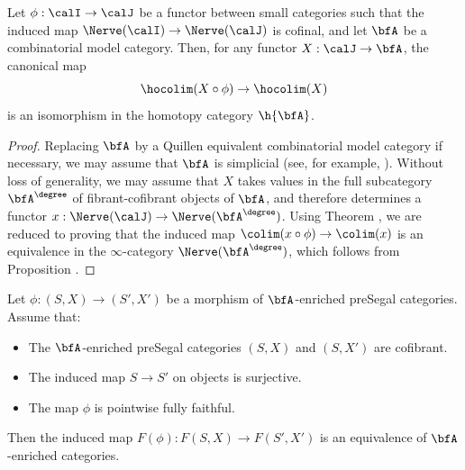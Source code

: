 \begin{lemma}\label{cuppl}
Let $\phi: \calI \rightarrow \calJ$ be a functor between small categories such that the induced map
$\Nerve( \calI ) \rightarrow \Nerve(\calJ)$ is cofinal, and let $\bfA$ be a combinatorial model category.
Then, for any functor $X: \calJ \rightarrow \bfA$, the canonical map
$$ \hocolim( X \circ \phi) \rightarrow \hocolim(X)$$
is an isomorphism in the homotopy category $\h{\bfA}$.
\end{lemma}

\begin{proof}
Replacing $\bfA$ by a Quillen equivalent combinatorial model category if necessary, we may assume that $\bfA$ is simplicial (see, for example, \cite{combmodel}). Without loss of generality, we may assume that $X$ takes values in the full subcategory $\bfA^{\degree}$ of fibrant-cofibrant objects of $\bfA$, and
therefore determines a functor $x: \Nerve(\calJ) \rightarrow \Nerve( \bfA^{\degree})$. 
Using Theorem , we are reduced to proving that the induced map
$\colim(x \circ \phi) \rightarrow \colim(x)$ is an equivalence in the $\infty$-category
$\Nerve(\bfA^{\degree})$, which follows from Proposition .
\end{proof}

\begin{proposition}\label{camble}
Let $\phi: (S,X) \rightarrow (S', X')$ be a morphism of $\bfA$-enriched preSegal categories. Assume that:
\begin{itemize}
\item[$(1)$] The $\bfA$-enriched preSegal categories $(S,X)$ and $(S, X')$ are cofibrant.
\item[$(2)$] The induced map $S \rightarrow S'$ on objects is surjective.
\item[$(3)$] The map $\phi$ is pointwise fully faithful.
\end{itemize}
Then the induced map $F(\phi): F(S,X) \rightarrow F(S',X')$ is an equivalence of $\bfA$-enriched categories.
\end{proposition}

